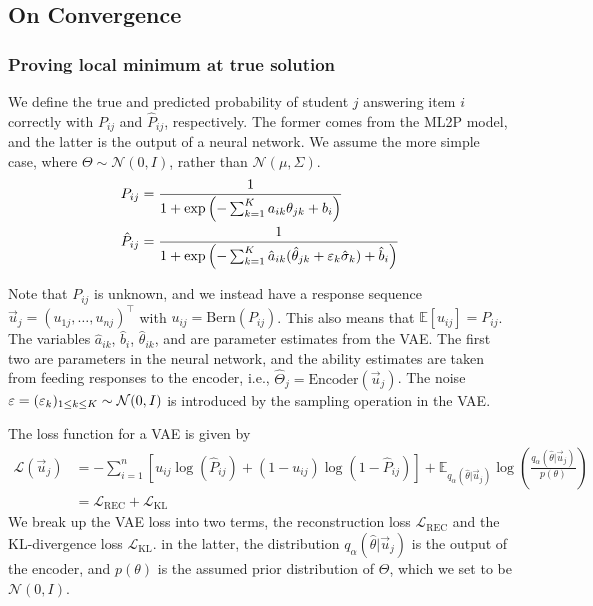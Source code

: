 \subsection{On Convergence}

\subsubsection{Proving local minimum at true solution}

We define the true and predicted probability of student $j$ answering item $i$ correctly with $P_{ij}$ and $\hat P_{ij}$, respectively. The former comes from the ML2P model, and the latter is the output of a neural network. We assume the more simple case, where $\Theta \sim \mathcal{N}(0,I)$, rather than $\mathcal{N}(\mu, \Sigma)$.
\begin{equation}
  \begin{split}
  P_{ij} &= \frac{1}{1 + \exp\left(-\sum_{k=1}^K a_{ik}\theta_{jk} + b_i\right)}\\
  \label{eq:ml2p_est}
  \hat P_{ij} &= \frac{1}{1 + \exp\left(-\sum_{k=1}^K \hat a_{ik} (\hat \theta_{jk} + \varepsilon_k \hat \sigma_k) + \hat b_i\right)} 
\end{split}
    \label{eq:vae_out}
\end{equation}

Note that $P_{ij}$ is unknown, and we instead have a response sequence $\vec u_j = (u_{1j},\ldots, u_{nj})^\top$ with $u_{ij} = \text{Bern}(P_{ij})$. This also means that $\mathbb{E}[u_{ij}] = P_{ij}$. The variables $\hat a_{ik}$, $\hat b_i$, $\hat \theta_{ik}$, and are parameter estimates from the VAE. The first two are parameters in the neural network, and the ability estimates are taken from feeding responses to the encoder, i.e., $\hat \Theta_j = \text{Encoder}(\vec u_j)$. The noise $\varepsilon = (\varepsilon_k)_{1\leq k \leq K} \sim \mathcal{N}(0,I)$ is introduced by the sampling operation in the VAE.


The loss function for a VAE is given by 
\begin{equation}
  \begin{split}
  \mathcal{L}(\vec u_j) &= -\sum_{i=1}^n \left[u_{ij} \log(\hat P_{ij}) + (1-u_{ij})\log(1 - \hat P_{ij})\right] + \mathbb{E}_{q_\alpha(\hat \theta | \vec u_j)}\log\left( \frac{q_{\alpha}(\hat \theta |\vec u_j)}{p(\theta)}\right) \\
    &= \mathcal{L}_{\text{REC}} + \mathcal{L}_{\text{KL}}
  \end{split}
  \label{eq:vae_loss}
\end{equation}
We break up the VAE loss into two terms, the reconstruction loss $\mathcal{L}_{\text{REC}}$ and the KL-divergence loss $\mathcal{L}_{\text{KL}}$. in the latter, the distribution $q_\alpha(\hat \theta | \vec u_j)$ is the output of the encoder, and $p(\theta)$ is the assumed prior distribution of $\Theta$, which we set to be $\mathcal{N}(0,I)$.

